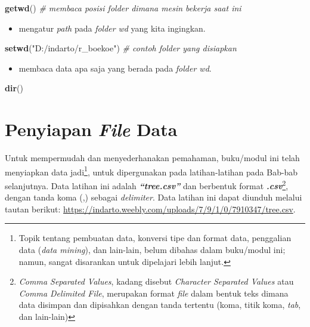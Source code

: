 \documentclass[
  12pt,
  a4paper,
]{scrbook}
\newenvironment{Shaded}{\begin{snugshade}}{\end{snugshade}}
\newcommand{\CommentTok}[1]{\textcolor[rgb]{0.56,0.35,0.01}{\textit{#1}}}
\newcommand{\KeywordTok}[1]{\textcolor[rgb]{0.13,0.29,0.53}{\textbf{#1}}}
\newcommand{\NormalTok}[1]{#1}
\newcommand{\StringTok}[1]{\textcolor[rgb]{0.31,0.60,0.02}{#1}}
\providecommand{\tightlist}{%
  \setlength{\itemsep}{0pt}\setlength{\parskip}{0pt}}
\begin{document}
\begin{Shaded}
\begin{Highlighting}[]
\KeywordTok{getwd}\NormalTok{()  }\CommentTok{# membaca posisi folder dimana mesin bekerja saat ini}
\end{Highlighting}
\end{Shaded}

\begin{itemize}
\tightlist
\item
  mengatur \emph{path} pada \emph{folder} \emph{wd} yang kita ingingkan.
\end{itemize}

\begin{Shaded}
\begin{Highlighting}[]
\KeywordTok{setwd}\NormalTok{(}\StringTok{"D:/indarto/r_boekoe"}\NormalTok{)  }\CommentTok{# contoh folder yang disiapkan}
\end{Highlighting}
\end{Shaded}

\begin{itemize}
\tightlist
\item
  membaca data apa saja yang berada pada \emph{folder wd}.
\end{itemize}

\begin{Shaded}
\begin{Highlighting}[]
\KeywordTok{dir}\NormalTok{()}
\end{Highlighting}
\end{Shaded}

\hypertarget{penyiapan-file-data}{%
\section{\texorpdfstring{Penyiapan \emph{File}
Data}{Penyiapan File Data}}\label{penyiapan-file-data}}

Untuk mempermudah dan menyederhanakan pemahaman, buku/modul ini telah
menyiapkan data jadi\footnote{Topik tentang pembuatan data, konversi
  tipe dan format data, penggalian data (\emph{data mining}), dan
  lain-lain, belum dibahas dalam buku/modul ini; namun, sangat
  disarankan untuk dipelajari lebih lanjut.}, untuk dipergunakan pada
latihan-latihan pada Bab-bab selanjutnya. Data latihan ini adalah
\textbf{\emph{``tree.csv''}} dan berbentuk format
\textbf{\emph{.csv}}\footnote{\emph{Comma Separated Values}, kadang
  disebut \emph{Character Separated Values} atau \emph{Comma Delimited
  File}, merupakan format \emph{file} dalam bentuk teks dimana data
  disimpan dan dipisahkan dengan tanda tertentu (koma, titik koma,
  \emph{tab}, dan lain-lain)}, dengan tanda koma (,) sebagai
\emph{delimiter}. Data latihan ini dapat diunduh melalui tautan berikut:
\url{https://indarto.weebly.com/uploads/7/9/1/0/7910347/tree.csv}.
\end{document}
